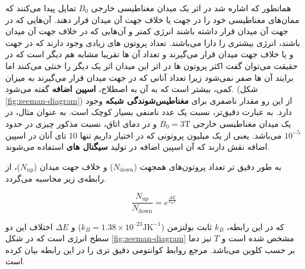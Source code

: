 همانطور که اشاره شد در اثر یک میدان مغناطیسی خارجی $B_0$ تمایل پیدا می‌کنند که ممان‌های مغناطیسی خود را در جهت یا خلاف جهت آن میدان قرار دهند. آن‌هایی که در جهت آن میدان قرار داشته باشند انرژی کمتر و آن‌هایی که در خلاف جهت آن میدان باشند، انرژی بیشتری را دارا می‌باشند.  تعداد پروتون های زیادی وجود دارند که در جهت و یا خلاف جهت میدان قرار می‌گیرند و تعداد آن ها تقریبا مشابه هم دیگر است که در حقیقت می‌توان گفت اکثر پروتون ها در اثر این میدان  اثر یک دیگر را خنثی می‌کنند اما برایند آن ها صفر نمی‌شود زیرا تعداد آنانی که در جهت میدان قرار می‌گیرند به میزان کمی، بیشتر است که به آن به اصطلاح، \textbf{اسپین اضافه}
گفته می‌شود.
(شکل \ref{fig:zeeman-diagram})
از این رو مقدار ناصفری برای \textbf{مغناطیس‌شوندگی شبکه} 
وجود دارد.
به عبارت دقیق‌تر، نسبت 
یک عدد نامنفی بسیار کوچک است. به عنوان مثال، در یک میدان مغناطیسی خارجی $B_0 = 3 \mathrm{T}$ و در دمای اتاق، نسبت مذکور چیزی در حدود $10^{-5}$ می‌باشد. یعنی از یک میلیون پروتونی که در اختیار داریم تنها 10 تای آنان در اسپین اضافه نقش دارند که آن اسپین اضافه در تولید \textbf{سیگنال های \mr}
استفاده می‌شوند.
\begin{figure}
	\centering
	\caption{}
	\label{fig:gyroscope-components}
\end{figure}

به طور دقیق تر تعداد پروتون‌های همجهت ($N_\text{down}$) و خلاف جهت میدان ($N_\text{up}$)، از رابطه‌‌ی زیر محاسبه می‌گردد.
 
 \removevspace
 \begin{equation}
 	\dfrac{N_\text{up}}{N_\text{down}} = e^{\frac{\Delta E}{k_B T}}
 \end{equation}

که در این رابطه، $k_B$ ثابت بولتزمن
($k_B = 1.38 × 10^{–23} \mathrm{J} \mathrm{K}^{-1}$)
 و $\Delta E$ اختلاف این دو سطح انرژی است که در شکل \ref{fig:zeeman-diagram}
 مشخص شده است و $T$ نیز دما بر حسب کلوین می‌باشد. مرجع \cite{McRobbie}
 روابط کوانتومی دقیق تری را در این رابطه بیان کرده است.
 
